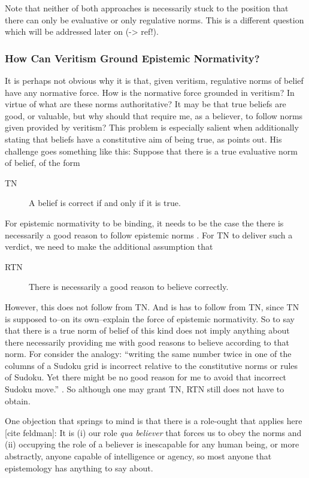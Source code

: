 \documentclass[12pt,numbers=noenddot]{scrartcl}
\begin{document}
Note that neither of both approaches is necessarily stuck to the position that there can only be evaluative or only regulative norms. This is a different question which will be addressed later on (-> ref!).

\subsubsection{How Can Veritism Ground Epistemic Normativity?}

It is perhaps not obvious why it is that, given veritism, regulative norms of belief have any normative force. How is the normative force grounded in veritism? In virtue of what are these norms authoritative? It may be that true beliefs are good, or valuable, but why should that require me, as a believer, to follow norms given provided by veritism? This problem is especially salient when additionally stating that beliefs have a constitutive aim of being true, as \textcite{Cote-BouchardForthcoming-CTBCTA} points out. His challenge goes something like this: Suppose that there is a true evaluative norm of belief, of the form
\begin{description}
    \item[TN] A belief is correct if and only if it is true. \autocite{Wedgwood2002-WEDTAO}
\end{description}
For epistemic normativity to be binding, it needs to be the case the there is necessarily a good reason to follow epistemic norms \textcite[13]{Cote-BouchardForthcoming-CTBCTA}. For TN to deliver such a verdict, we need to make the additional assumption that
\begin{description}
    \item[RTN] There is necessarily a good reason to believe correctly.
\end{description}
However, this does not follow from TN. And is has to follow from TN, since TN is supposed to–on its own–explain the force of epistemic normativity. So to say that there is a true norm of belief of this kind does not imply anything about there necessarily providing me with good reasons to believe according to that norm. For consider the analogy: “writing the same number twice in one of the columns of a Sudoku grid is incorrect relative to the constitutive norms or rules of Sudoku. Yet there might be no good reason for me to avoid that incorrect Sudoku move.” \autocite[12]{Cote-BouchardForthcoming-CTBCTA}. So although one may grant TN, RTN still does not have to obtain.

One objection that springs to mind is that there is a role-ought that applies here [cite feldman]: It is (i) our role \emph{qua believer} that forces us to obey the norms and (ii) occupying the role of a believer is inescapable for any human being, or more abstractly, anyone capable of intelligence or agency, so most anyone that epistemology has anything to say about.
\end{document}
